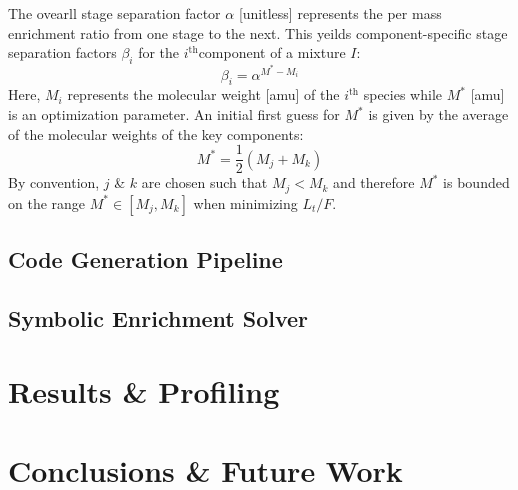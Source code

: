 \documentclass[preprint,12pt]{elsarticle}
\newcommand{\superscript}[1]{\ensuremath{^{\textrm{#1}}}}
\newcommand{\ith}[0]{$i$\superscript{th}}
\begin{document}
The ovearll stage separation factor $\alpha$ [unitless] represents the per mass 
enrichment ratio from one stage to the next.  This yeilds component-specific
stage separation factors $\beta_i$ for the \ith component of a mixture $I$:
\begin{equation}
\beta_i = \alpha^{M^* - M_i}
\label{beta_i}
\end{equation}
Here, $M_i$ represents the molecular weight [amu] of the \ith
species while $M^*$ [amu] is an optimization parameter.  An initial first guess for 
$M^*$ is given by the average of the molecular weights of the key components:
\begin{equation}
M^* = \frac{1}{2}\left(M_j + M_k\right)
\end{equation}
By convention, $j$ \& $k$ are chosen such that $M_j < M_k$ and 
therefore $M^*$ is bounded on the range $M^*\in[M_j,M_k]$ when minimizing $L_t/F$.


\subsection{Code Generation Pipeline}
\label{sec:codegen}

\subsection{Symbolic Enrichment Solver}
\label{sec:symes}

\section{Results \& Profiling}
\label{sec:res}

\section{Conclusions \& Future Work}
\label{sec:conc}


\end{document}
